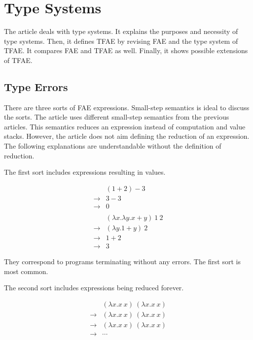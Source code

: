 \setchapterpreamble[u]{\margintoc}
\chapter{Type Systems}

The article deals with type systems. It explains the purposes and necessity of
type systems. Then, it defines TFAE by revising FAE and the type system of TFAE.
It compares FAE and TFAE as well. Finally, it shows possible extensions of TFAE.

\section{Type Errors}

There are three sorts of FAE expressions. Small-step semantics is ideal to
discuss the sorts. The article uses different small-step semantics from the
previous articles. This semantics reduces an expression instead of computation
and value stacks. However, the article does not aim defining the reduction of an
expression. The following explanations are understandable without the definition
of reduction.

The first sort includes expressions resulting in values.

\[
\begin{array}{rl}
& (1+2)-3 \\
\rightarrow & 3-3 \\
\rightarrow & 0 \\
\\
& (\lambda x.\lambda y.x+y)\ 1\ 2 \\
\rightarrow & (\lambda y.1+y)\ 2 \\
\rightarrow & 1+2 \\
\rightarrow & 3
\end{array}
\]

They correspond to programs terminating without any errors. The first sort is
most common.

The second sort includes expressions being reduced forever.

\[
\begin{array}{rl}
& (\lambda x.x\ x)\ (\lambda x.x\ x) \\
\rightarrow & (\lambda x.x\ x)\ (\lambda x.x\ x) \\
\rightarrow & (\lambda x.x\ x)\ (\lambda x.x\ x) \\
\rightarrow & \cdots
\end{array}
\]

